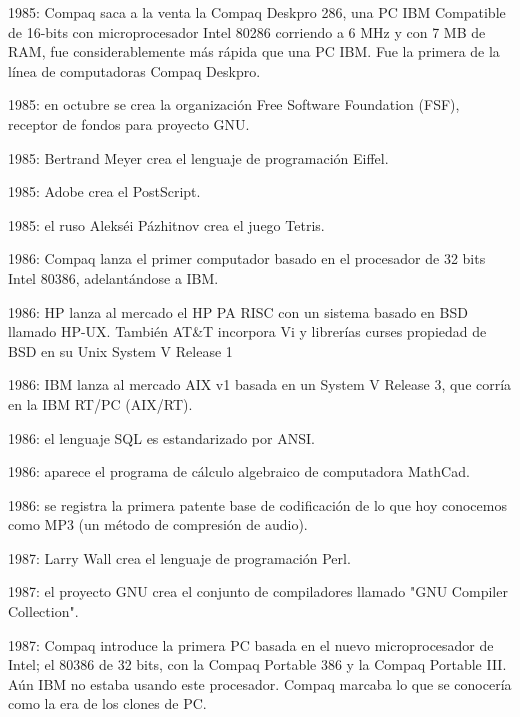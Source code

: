 \documentclass{article}
\begin{document}
{    \item 1985: Compaq saca a la venta la Compaq Deskpro 286, una PC IBM Compatible de 16-bits con microprocesador Intel 80286 corriendo a 6 MHz y con 7 MB de RAM, fue considerablemente más rápida que una PC IBM. Fue la primera de la línea de computadoras Compaq Deskpro.
    \item 1985: en octubre se crea la organización Free Software Foundation (FSF), receptor de fondos para proyecto GNU.
    \item 1985: Bertrand Meyer crea el lenguaje de programación Eiffel.
    \item 1985: Adobe crea el PostScript.
    \item 1985: el ruso Alekséi Pázhitnov crea el juego Tetris.
    \item 1986: Compaq lanza el primer computador basado en el procesador de 32 bits Intel 80386, adelantándose a IBM.
    \item 1986: HP lanza al mercado el HP PA RISC con un sistema basado en BSD llamado HP-UX. También AT&T incorpora Vi y librerías curses propiedad de BSD en su Unix System V Release 1
    \item 1986: IBM lanza al mercado AIX v1 basada en un System V Release 3, que corría en la IBM RT/PC (AIX/RT).
    \item 1986: el lenguaje SQL es estandarizado por ANSI.
    \item 1986: aparece el programa de cálculo algebraico de computadora MathCad.
    \item 1986: se registra la primera patente base de codificación de lo que hoy conocemos como MP3 (un método de compresión de audio).
    \item 1987: Larry Wall crea el lenguaje de programación Perl.
    \item 1987: el proyecto GNU crea el conjunto de compiladores llamado "GNU Compiler Collection".
    \item 1987: Compaq introduce la primera PC basada en el nuevo microprocesador de Intel; el 80386 de 32 bits, con la Compaq Portable 386 y la Compaq Portable III. Aún IBM no estaba usando este procesador. Compaq marcaba lo que se conocería como la era de los clones de PC.
}
\end{document}
